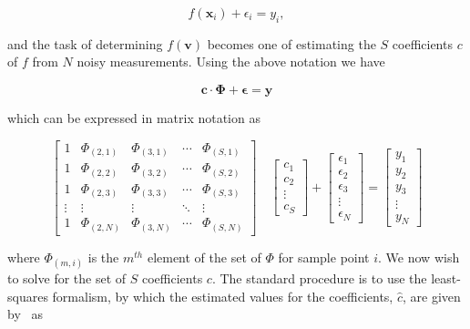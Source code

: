\begin{equation}
    f(\bm{x}_i) + \epsilon_i = y_i,\label{eq:equation6}
\end{equation}

and the task of determining $f(\bm{v})$ becomes one of estimating the $S$
coefficients $c$ of $f$ from $N$ noisy measurements.
Using the above notation we have

\begin{equation}
    \mathbf{c} \cdot \mathbf{\Phi} + \bm{\epsilon} = \mathbf{y}
    \label{eq:equation7}
\end{equation}

which can be expressed in matrix notation as

\begin{equation}
    \begin{bmatrix}
        1 & \Phi_{(2,1)} & \Phi_{(3,1)} & \cdots & \Phi_{(S,1)} \\
        1 & \Phi_{(2,2)} & \Phi_{(3,2)} & \cdots & \Phi_{(S,2)} \\
        1 & \Phi_{(2,3)} & \Phi_{(3,3)} & \cdots & \Phi_{(S,3)} \\
        \vdots & \vdots & \vdots & \ddots & \vdots \\
        1 & \Phi_{(2,N)} & \Phi_{(3,N)} & \cdots & \Phi_{(S,N)}
    \end{bmatrix}
    \quad
    \begin{bmatrix}
        c_1 \\
        c_2 \\
        \vdots \\
        c_S
    \end{bmatrix}
    +
    \begin{bmatrix}
        \epsilon_1 \\
        \epsilon_2 \\
        \epsilon_3 \\
        \vdots \\
        \epsilon_N
    \end{bmatrix}
    =
    \begin{bmatrix}
        y_1 \\
        y_2 \\
        y_3 \\
        \vdots \\
        y_N
    \end{bmatrix}
    \label{eq:equation8}
\end{equation}

where $\Phi_{(m,i)}$ is the $m^{th}$ element of the set of $\Phi$ for sample point
$i$.
We now wish to solve for the set of $S$ coefficients $c$.
The standard procedure is to use the least-squares formalism, by which the
estimated values for the coefficients, $\hat{c}$, are given by~\citet{Fan96b}
as

